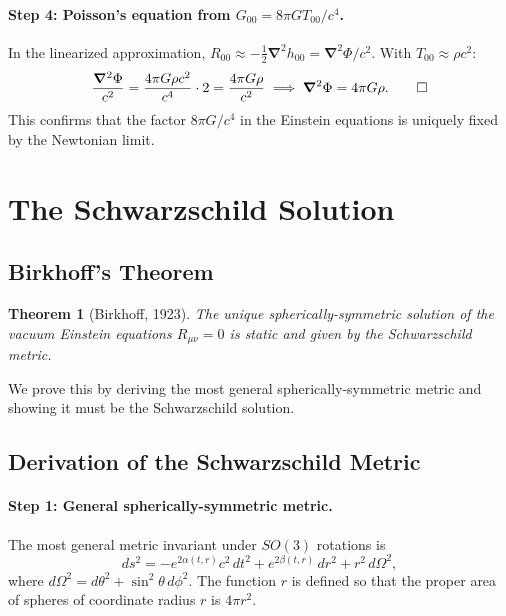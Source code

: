 \documentclass[12pt,a4paper]{article}
\theoremstyle{plain}
\newtheorem{theorem}{Theorem}[section]
\theoremstyle{definition}
\theoremstyle{remark}
\newcommand{\nab}{\boldsymbol{\nabla}}
\begin{document}
\paragraph{Step 4: Poisson's equation from $G_{00}=8\pi GT_{00}/c^4$.}
In the linearized approximation, $R_{00}\approx-\tfrac{1}{2}\nab^2 h_{00} = \nab^2\Phi/c^2$. With $T_{00}\approx\rho c^2$:
\[
  \frac{\nab^2\Phi}{c^2} = \frac{4\pi G\rho c^2}{c^4}\cdot2 = \frac{4\pi G\rho}{c^2}
  \implies
  \nab^2\Phi = 4\pi G\rho. \qed
\]
This confirms that the factor $8\pi G/c^4$ in the Einstein equations is uniquely fixed by the Newtonian limit.

\section{The Schwarzschild Solution}

\subsection{Birkhoff's Theorem}

\begin{theorem}[Birkhoff, 1923]\label{thm:birkhoff}
The unique spherically-symmetric solution of the vacuum Einstein equations $R_{\mu\nu}=0$ is static and given by the Schwarzschild metric.
\end{theorem}

We prove this by deriving the most general spherically-symmetric metric and showing it must be the Schwarzschild solution.

\subsection{Derivation of the Schwarzschild Metric}

\paragraph{Step 1: General spherically-symmetric metric.}
The most general metric invariant under $SO(3)$ rotations is
\begin{equation}\label{eq:genmetric}
  ds^2 = -e^{2\alpha(t,r)}c^2\,dt^2 + e^{2\beta(t,r)}\,dr^2 + r^2\,d\Omega^2,
\end{equation}
where $d\Omega^2 = d\theta^2+\sin^2\theta\,d\phi^2$. The function $r$ is defined so that the proper area of spheres of coordinate radius $r$ is $4\pi r^2$.
\end{document}
